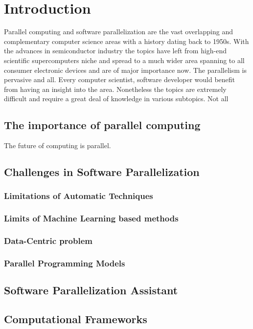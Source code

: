 \chapter{Introduction}
\quad Parallel computing and software parallelization are the vast overlapping and complementary computer science areas with a history dating back to 1950s. With the advances in semiconductor industry the topics have left from high-end scientific supercomputers niche and spread to a much wider area spanning to all consumer electronic devices and are of major importance now. The parallelism is pervasive and all. Every computer scientist, software developer would benefit from having an insight into the area. Nonetheless the topics are extremely difficult and require a great deal of knowledge in various subtopics. Not all 

\section{The importance of parallel computing}
\quad The future of computing is parallel. 


\section{Challenges in Software Parallelization}
\subsection{Limitations of Automatic Techniques}
\subsection{Limits of Machine Learning based methods}
\subsection{Data-Centric problem}
\subsection{Parallel Programming Models}
\section{Software Parallelization Assistant}
\section{Computational Frameworks}
